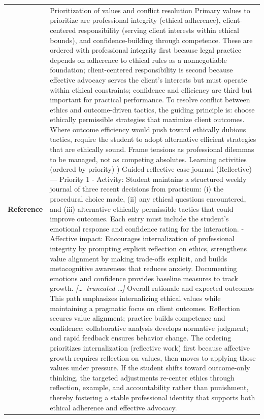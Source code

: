 \begin{longtable}{@{}l p{12.5cm}@{}}
  \textbf{Reference} & Prioritization of values and conflict resolution \newline Primary values to prioritize are professional integrity (ethical adherence), client-centered responsibility (serving client interests within ethical bounds), and confidence-building through competence. These are ordered with professional integrity first because legal practice depends on adherence to ethical rules as a nonnegotiable foundation; client-centered responsibility is second because effective advocacy serves the client's interests but must operate within ethical constraints; confidence and efficiency are third but important for practical performance. To resolve conflict between ethics and outcome-driven tactics, the guiding principle is: choose ethically permissible strategies that maximize client outcomes. Where outcome efficiency would push toward ethically dubious tactics, require the student to adopt alternative efficient strategies that are ethically sound. Frame tensions as professional dilemmas to be managed, not as competing absolutes. \newline Learning activities (ordered by priority) \newline 1) Guided reflective case journal (Reflective) --- Priority 1 \newline - Activity: Student maintains a structured weekly journal of three recent decisions from practicum: (i) the procedural choice made, (ii) any ethical questions encountered, and (iii) alternative ethically permissible tactics that could improve outcomes. Each entry must include the student's emotional response and confidence rating for the interaction. \newline - Affective impact: Encourages internalization of professional integrity by prompting explicit reflection on ethics, strengthens value alignment by making trade-offs explicit, and builds metacognitive awareness that reduces anxiety. Documenting emotions and confidence provides baseline measures to track growth. \newline \textit{[\ldots\ truncated \ldots]} \newline Overall rationale and expected outcomes \newline This path emphasizes internalizing ethical values while maintaining a pragmatic focus on client outcomes. Reflection secures value alignment; practice builds competence and confidence; collaborative analysis develops normative judgment; and rapid feedback ensures behavior change. The ordering prioritizes internalization (reflective work) first because affective growth requires reflection on values, then moves to applying those values under pressure. If the student shifts toward outcome-only thinking, the targeted adjustments re-center ethics through reflection, example, and accountability rather than punishment, thereby fostering a stable professional identity that supports both ethical adherence and effective advocacy. \\

\end{longtable}

